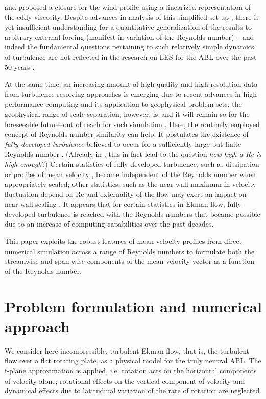 \documentclass[smallcondensed,final]{svjour3}
\newcommand{\RE}{\mathrm{Re}}
\begin{document}
and \cite{zikanov:JFM2003} proposed a closure for the wind profile using a linearized representation of the eddy viscosity.
%
Despite advances in analysis of this simplified set-up \citep{jiang:JAS2018}, 
there is yet insufficient understanding for a quantitative generalization of the results to
arbitrary external forcing (manifest in variation of the Reynolds number) -- and indeed the fundamental
questions pertaining to such relatively simple dynamics of turbulence are not reflected in the
research on LES for the ABL over the past 50 years \citep{stoll:BM2020}. 
%
\par
% 
At the same time, an increasing amount of high-quality and high-resolution data from turbulence-resolving approaches
is emerging due to recent advances in high-performance computing and its application to geophysical problem sets;
the geophysical range of scale separation, however, is--and it will remain so for the foreseeable future--out of reach
for such simulation \citep{dimotakis:ARF2005}.
%
Here, the routinely employed concept of Reynolds-number similarity can help. It postulates the existence
of \emph{fully developed turbulence}  believed to occur for a sufficiently large but finite Reynolds number
\citep{barenblatt:PF1995}.
%
(Already in \citeyear{moin:ARF1998}, this in fact lead \citeauthor{moin:ARF1998} to the question \emph{how high a Re is high enough}?) 
%
Certain statistics of fully developed turbulence, such as dissipation \citep{dimotakis:ARF2005} or profiles of
mean velocity \citep{barenblatt:JFM1993}, become independent of the Reynolds number when appropriately scaled; 
other statistics, such as the near-wall maximum in velocity fluctuation depend on $\RE$ \citep{baars:JFM2020a} and externality
of the flow may exert an impact on near-wall scaling \citep{dasilva:ARF2014}. 
%
It appears that for certain statistics in Ekman flow, fully-developed turbulence is reached with the
Reynolds numbers that became possible due to an increase of computing capabilities over
the past decades.
%
\par
% 
This paper exploits the robust features of mean velocity profiles from direct numerical
simulation across a range of Reynolds numbers to formulate both the streamwise and span-wise components
of the mean velocity vector as a function of the Reynolds number.
%
\section{Problem formulation and numerical approach}
%
We consider here incompressible, turbulent Ekman flow, that is, the turbulent flow over a flat rotating plate, as a physical model for the truly neutral ABL.
%
The f-plane approximation is applied, i.e. rotation acts on the horizontal components of velocity alone;
rotational effects on the vertical component of velocity and dynamical effects
due to latitudinal variation of the rate of rotation are neglected.
%
\end{document}
